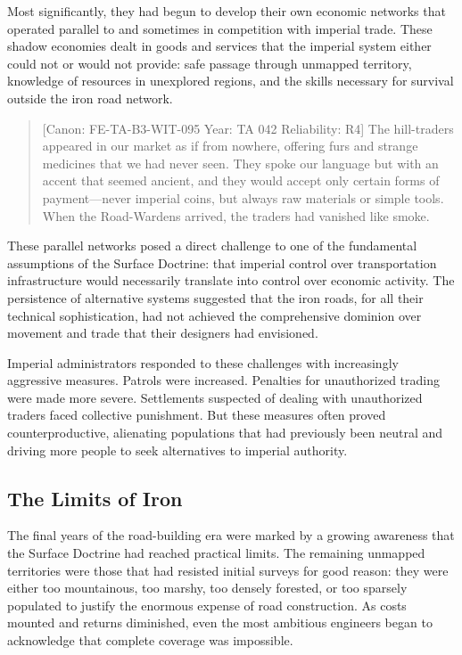 Most significantly, they had begun to develop their own economic
networks that operated parallel to and sometimes in competition with
imperial trade. These shadow economies dealt in goods and services that
the imperial system either could not or would not provide: safe passage
through unmapped territory, knowledge of resources in unexplored
regions, and the skills necessary for survival outside the iron road
network.

\begin{quote}
{[}Canon: FE-TA-B3-WIT-095 \textbar{} Year: TA 042 \textbar{}
Reliability: R4{]} The hill-traders appeared in our market as if from
nowhere, offering furs and strange medicines that we had never seen.
They spoke our language but with an accent that seemed ancient, and they
would accept only certain forms of payment---never imperial coins, but
always raw materials or simple tools. When the Road-Wardens arrived, the
traders had vanished like smoke.
\end{quote}

These parallel networks posed a direct challenge to one of the
fundamental assumptions of the Surface Doctrine: that imperial control
over transportation infrastructure would necessarily translate into
control over economic activity. The persistence of alternative systems
suggested that the iron roads, for all their technical sophistication,
had not achieved the comprehensive dominion over movement and trade that
their designers had envisioned.

Imperial administrators responded to these challenges with increasingly
aggressive measures. Patrols were increased. Penalties for unauthorized
trading were made more severe. Settlements suspected of dealing with
unauthorized traders faced collective punishment. But these measures
often proved counterproductive, alienating populations that had
previously been neutral and driving more people to seek alternatives to
imperial authority.

\subsection{The Limits of Iron}\label{the-limits-of-iron}

The final years of the road-building era were marked by a growing
awareness that the Surface Doctrine had reached practical limits. The
remaining unmapped territories were those that had resisted initial
surveys for good reason: they were either too mountainous, too marshy,
too densely forested, or too sparsely populated to justify the enormous
expense of road construction. As costs mounted and returns diminished,
even the most ambitious engineers began to acknowledge that complete
coverage was impossible.

